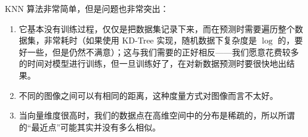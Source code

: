 KNN 算法非常简单，但是问题也非常突出：

\begin{enumerate}
    \item 它基本没有训练过程，仅仅是把数据集记录下来，而在预测时需要遍历整个数据集，非常耗时（如果使用 KD-Tree 实现，随机数据下复杂度是 $\log$ 的，要好一些，但是仍然不满意）；这与我们需要的正好相反——我们愿意花费较多的时间对模型进行训练，但一旦训练好了，在对新数据预测时要很快地出结果。
    \item 不同的图像之间可以有相同的距离，这种度量方式对图像而言不太好。
    \item 当向量维度很高时，我们的数据点在高维空间中的分布是稀疏的，所以所谓的“最近点”可能其实并没有多么相似。
\end{enumerate}
